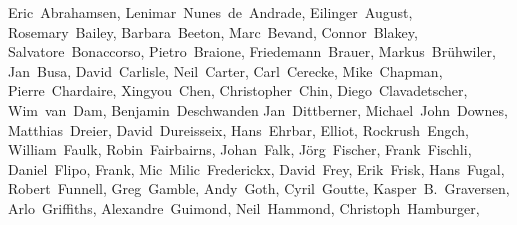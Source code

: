 \begin{flushleft}
\small
Eric~Abrahamsen,        %
Lenimar~Nunes~de~Andrade, %
Eilinger~August,        %
Rosemary~Bailey,        %
Barbara~Beeton,         %
Marc~Bevand,            %
Connor~Blakey,          %
Salvatore~Bonaccorso,   %
Pietro~Braione,         %
Friedemann~Brauer,      %
Markus~Br\"uhwiler,     %
Jan~Busa,               %
David~Carlisle,         %
Neil~Carter,            %
Carl~Cerecke,           %
Mike~Chapman,           %
Pierre~Chardaire,       %
Xingyou~Chen,           %
Christopher~Chin,       %
Diego~Clavadetscher,    %
Wim~van~Dam,            %
Benjamin~Deschwanden    %
Jan~Dittberner,         %
Michael~John~Downes,    %
Matthias~Dreier,        %
David~Dureisseix,       %
Hans~Ehrbar,            %
Elliot,                 %
Rockrush~Engch,         %
William~Faulk,          %
Robin~Fairbairns,       %
Johan~Falk,             %
J\"org~Fischer,         %
Frank~Fischli,          %
Daniel~Flipo,           %
Frank,                  %
Mic~Milic~Frederickx,   %
David~Frey,             %
Erik~Frisk,             %
Hans~Fugal,             %
Robert~Funnell,         %
Greg~Gamble,            %
Andy~Goth,              %
Cyril~Goutte,           %
Kasper~B.~Graversen,    %
Arlo~Griffiths,         %
Alexandre~Guimond,      %
Neil~Hammond,           %
Christoph~Hamburger,    %

\end{flushleft}
